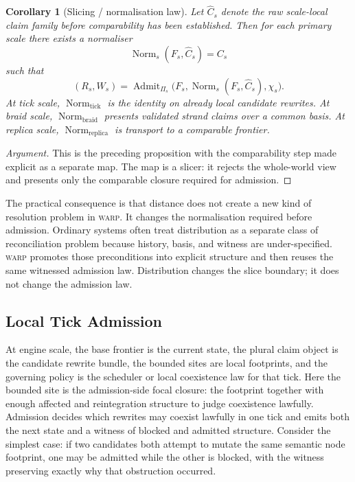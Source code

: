 \documentclass[11pt]{article}
\theoremstyle{definition}
\theoremstyle{plain}
\newtheorem{corollary}[definition]{Corollary}
\theoremstyle{remark}
\newcommand{\WARP}{\textsc{warp}}
\newenvironment{argument}{\begin{proof}[Argument]}{\end{proof}}
\begin{document}
\begin{corollary}[Slicing / normalisation law]
Let \(\widehat{C}_s\) denote the raw scale-local claim family before
comparability has been established. Then for each primary scale there exists a
normaliser
\[
\operatorname{Norm}_s(F_s, \widehat{C}_s) = C_s
\]
such that
\[
(R_s, W_s)
=
\operatorname{Admit}_{\Pi_s}
\bigl(F_s, \operatorname{Norm}_s(F_s, \widehat{C}_s), \chi_s\bigr).
\]
At tick scale, \(\operatorname{Norm}_{\mathrm{tick}}\) is the identity on
already local candidate rewrites. At braid scale,
\(\operatorname{Norm}_{\mathrm{braid}}\) presents validated strand claims over
a common basis. At replica scale, \(\operatorname{Norm}_{\mathrm{replica}}\)
is transport to a comparable frontier.
\end{corollary}

\begin{argument}
This is the preceding proposition with the comparability step made explicit as a
separate map. The map is a slicer: it rejects the whole-world view and presents only the comparable closure required for admission.
\end{argument}

The practical consequence is that distance does not create a new kind of
resolution problem in \WARP{}. It changes the normalisation required before
admission. Ordinary systems often treat distribution as a separate class of
reconciliation problem because history, basis, and witness are under-specified.
\WARP{} promotes those preconditions into explicit structure and then reuses
the same witnessed admission law. Distribution changes the slice boundary; it
does not change the admission law.

\subsection{Local Tick Admission}

At engine scale, the base frontier is the current state, the plural claim object is the candidate rewrite bundle, the bounded sites are local footprints, and the governing policy is the scheduler or local coexistence law for that tick. Here the bounded site is the admission-side focal closure: the footprint together with enough affected and reintegration structure to judge coexistence lawfully. Admission decides which rewrites may coexist lawfully in one tick and emits both the next state and a witness of blocked and admitted structure. Consider the simplest case: if two candidates both attempt to mutate the same semantic node footprint, one may be admitted while the other is blocked, with the witness preserving exactly why that obstruction occurred.
\end{document}
